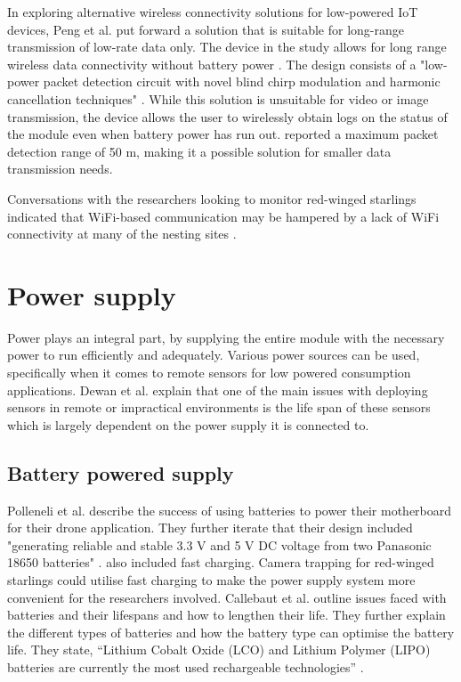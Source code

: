 In exploring alternative wireless connectivity solutions for low-powered IoT devices, Peng et al. \cite{peng2018plora} put forward a solution that is suitable for long-range transmission of low-rate data only. The device in the study allows for long range wireless data connectivity without battery power \cite{peng2018plora}. The design consists of a "low-power packet detection circuit with novel blind chirp modulation and harmonic cancellation techniques" \cite{peng2018plora}. While this solution is unsuitable for video or image transmission, the device allows the user to wirelessly obtain logs on the status of the module even when battery power has run out. \cite{peng2018plora} reported a maximum packet detection range of 50 m, making it a possible solution for smaller data transmission needs. 

Conversations with the researchers looking to monitor red-winged starlings indicated that WiFi-based communication may be hampered by a lack of WiFi connectivity at many of the nesting sites \cite{hofmeyer2024private}.

\section{Power supply}

Power plays an integral part, by supplying the entire module with the necessary power to run efficiently and adequately. Various power sources can be used, specifically when it comes to remote sensors for low powered consumption applications. Dewan et al. \cite{dewan2014alternative} explain that one of the main issues with deploying sensors in remote or impractical environments is the life span of these sensors which is largely dependent on the power supply it is connected to. 

\subsection{Battery powered supply}

Polleneli et al. \cite{polonelli2020flexible} describe the success of using batteries to power their motherboard for their drone application. They further iterate that their design included "generating reliable and stable 3.3 V and 5 V DC voltage from two Panasonic 18650 batteries" \cite{polonelli2020flexible}. \cite{polonelli2020flexible} also included fast charging. Camera trapping for red-winged starlings could utilise fast charging to make the power supply system more convenient for the researchers involved. Callebaut et al. \cite{callebaut2021art} outline issues faced with batteries and their lifespans and how to lengthen their life. They further explain the different types of batteries and how the battery type can optimise the battery life. They state, “Lithium Cobalt Oxide (LCO) and Lithium Polymer (LIPO) batteries are currently the most used rechargeable technologies” \cite{callebaut2021art}.

